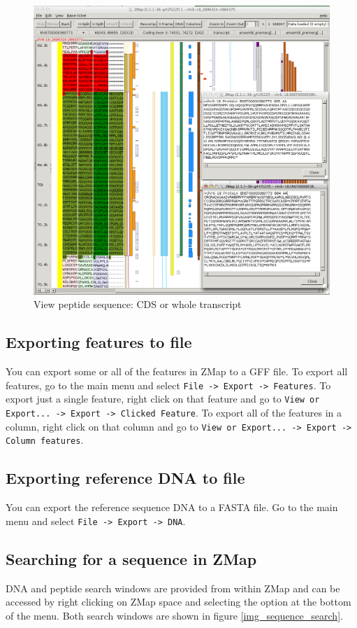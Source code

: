 \documentclass[letterpaper]{article}
\begin{document}
\begin{figure}
\centering
\color[rgb]{0.30980393,0.5058824,0.7411765}
\includegraphics[width=15.231cm]{images/view_peptide.png}
\caption{View peptide sequence: CDS or whole transcript}
\label{img_view_peptide}
\end{figure}


\subsection{Exporting features to file}
You can export some or all of the features in ZMap to a GFF file. To export all features, go to the main menu and select \lstinline{File -> Export -> Features}. To export just a single feature, right click on that feature and go to \lstinline{View or Export... -> Export -> Clicked Feature}. To export all of the features in a column, right click on that column and go to \lstinline{View or Export... -> Export -> Column features}.


\subsection{Exporting reference DNA to file}
You can export the reference sequence DNA to a FASTA file. Go to the main menu and select \lstinline{File -> Export -> DNA}. 


\subsection{Searching for a sequence in ZMap}
DNA and peptide search windows are provided from within ZMap and can be accessed by right clicking on ZMap space and selecting the option at the bottom of the menu. Both search windows are shown in figure \ref{img_sequence_search}.
\end{document}
